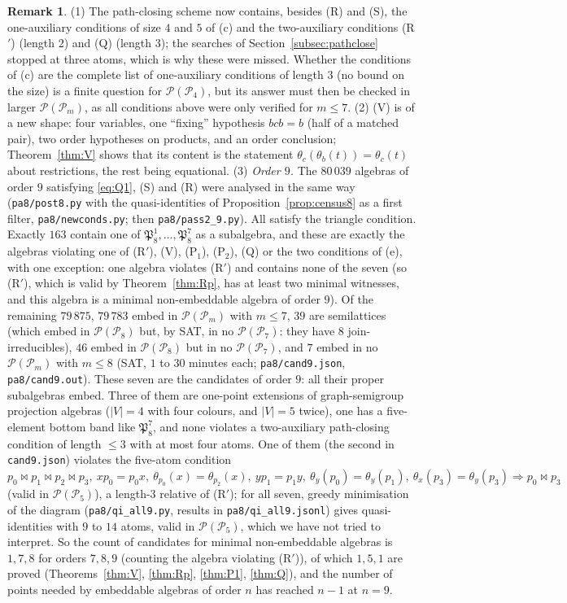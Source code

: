 \documentclass[11pt]{amsart}
\theoremstyle{definition}
\newtheorem{remark}[theorem]{Remark}
\renewcommand{\P}{\mathcal{P}}
\newcommand{\mt}{\bowtie}   %
\begin{document}
\begin{remark}\label{rem:census8}
(1) The path-closing scheme now contains, besides (R) and (S), the one-auxiliary conditions of size $4$ and $5$ of (c) and the two-auxiliary conditions (R$'$) (length $2$) and (Q) (length $3$); the searches of Section~\ref{subsec:pathclose} stopped at three atoms, which is why these were missed. Whether the conditions of (c) are the complete list of one-auxiliary conditions of length $3$ (no bound on the size) is a finite question for $\P(\P_4)$, but its answer must then be checked in larger $\P(\P_m)$, as all conditions above were only verified for $m\le7$. (2) (V) is of a new shape: four variables, one ``fixing'' hypothesis $bcb=b$ (half of a matched pair), two order hypotheses on products, and an order conclusion; Theorem~\ref{thm:V} shows that its content is the statement $\theta_c(\theta_b(t))=\theta_c(t)$ about restrictions, the rest being equational. (3) \emph{Order $9$.} The $80\,039$ algebras of order $9$ satisfying \eqref{eq:Q1}, (S) and (R) were analysed in the same way (\texttt{pa8/post8.py} with the quasi-identities of Proposition~\ref{prop:census8} as a first filter, \texttt{pa8/newconds.py}; then \texttt{pa8/pass2\_9.py}). All satisfy the triangle condition. Exactly $163$ contain one of $\mathfrak P_8^1,\dots,\mathfrak P_8^7$ as a subalgebra, and these are exactly the algebras violating one of (R$'$), (V), (P$_1$), (P$_2$), (Q) or the two conditions of (e), with one exception: one algebra violates (R$'$) and contains none of the seven (so (R$'$), which is valid by Theorem~\ref{thm:Rp}, has at least two minimal witnesses, and this algebra is a minimal non-embeddable algebra of order $9$). Of the remaining $79\,875$, $79\,783$ embed in $\P(\P_m)$ with $m\le7$, $39$ are semilattices (which embed in $\P(\P_8)$ but, by SAT, in no $\P(\P_7)$: they have $8$ join-irreducibles), $46$ embed in $\P(\P_8)$ but in no $\P(\P_7)$, and $7$ embed in no $\P(\P_m)$ with $m\le8$ (SAT, $1$ to $30$ minutes each; \texttt{pa8/cand9.json}, \texttt{pa8/cand9.out}). These seven are the candidates of order $9$: all their proper subalgebras embed. Three of them are one-point extensions of graph-semigroup projection algebras ($|V|=4$ with four colours, and $|V|=5$ twice), one has a five-element bottom band like $\mathfrak P_8^7$, and none violates a two-auxiliary path-closing condition of length $\le3$ with at most four atoms. One of them (the second in \texttt{cand9.json}) violates the five-atom condition $p_0\mt p_1\mt p_2\mt p_3,\ xp_0=p_0x,\ \theta_{p_0}(x)=\theta_{p_2}(x),\ yp_1=p_1y,\ \theta_y(p_0)=\theta_y(p_1),\ \theta_x(p_3)=\theta_y(p_3)\Rightarrow p_0\mt p_3$ (valid in $\P(\P_5)$), a length-$3$ relative of (R$'$); for all seven, greedy minimisation of the diagram (\texttt{pa8/qi\_all9.py}, results in \texttt{pa8/qi\_all9.jsonl}) gives quasi-identities with $9$ to $14$ atoms, valid in $\P(\P_5)$, which we have not tried to interpret. So the count of candidates for minimal non-embeddable algebras is $1, 7, 8$ for orders $7, 8, 9$ (counting the algebra violating (R$'$)), of which $1,5,1$ are proved (Theorems~\ref{thm:V}, \ref{thm:Rp}, \ref{thm:P1}, \ref{thm:Q}), and the number of points needed by embeddable algebras of order $n$ has reached $n-1$ at $n=9$.

\end{remark}
\end{document}
